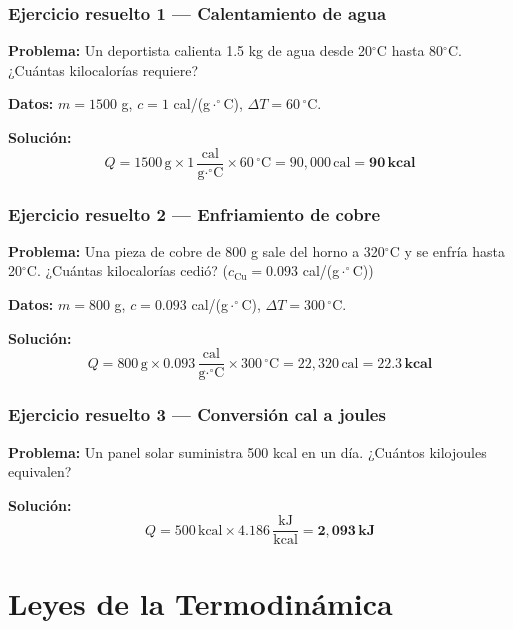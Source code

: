 \subsubsection*{Ejercicio resuelto 1 --- Calentamiento de agua}

\begin{seccion}
\textbf{Problema:} Un deportista calienta 1.5 kg de agua desde 20$^\circ$C hasta 80$^\circ$C. ¿Cuántas kilocalorías requiere?

\textbf{Datos:} $m = 1500$ g, $c = 1$ cal/(g$\cdot^\circ$C), $\Delta T = 60\,^\circ$C.

\textbf{Solución:}
$$Q = 1500\,\text{g} \times 1\,\frac{\text{cal}}{\text{g}\cdot^\circ\text{C}} \times 60\,^\circ\text{C} = 90{,}000\,\text{cal} = \mathbf{90\,\text{kcal}}$$
\end{seccion}

\subsubsection*{Ejercicio resuelto 2 --- Enfriamiento de cobre}

\begin{seccion}
\textbf{Problema:} Una pieza de cobre de 800 g sale del horno a 320$^\circ$C y se enfría hasta 20$^\circ$C. ¿Cuántas kilocalorías cedió? ($c_{\text{Cu}} = 0.093$ cal/(g$\cdot^\circ$C))

\textbf{Datos:} $m = 800$ g, $c = 0.093$ cal/(g$\cdot^\circ$C), $\Delta T = 300\,^\circ$C.

\textbf{Solución:}
$$Q = 800\,\text{g} \times 0.093\,\frac{\text{cal}}{\text{g}\cdot^\circ\text{C}} \times 300\,^\circ\text{C} = 22{,}320\,\text{cal} = \mathbf{22.3\,\text{kcal}}$$
\end{seccion}

\subsubsection*{Ejercicio resuelto 3 --- Conversión cal a joules}

\begin{seccion}
\textbf{Problema:} Un panel solar suministra 500 kcal en un día. ¿Cuántos kilojoules equivalen?

\textbf{Solución:}
$$Q = 500\,\text{kcal} \times 4.186\,\frac{\text{kJ}}{\text{kcal}} = \mathbf{2{,}093\,\text{kJ}}$$
\end{seccion}

\section{Leyes de la Termodinámica}


